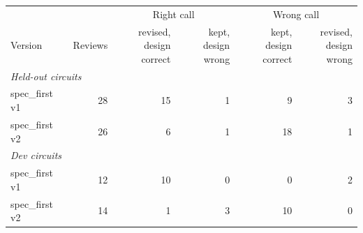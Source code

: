 \begin{tabular}{l r rr rr}
\toprule
& & \multicolumn{2}{c}{Right call} & \multicolumn{2}{c}{Wrong call} \\
\cmidrule(lr){3-4}\cmidrule(lr){5-6}
Version & Reviews & \makecell{revised,\\design correct} & \makecell{kept,\\design wrong} & \makecell{kept,\\design correct} & \makecell{revised,\\design wrong} \\
\midrule
\multicolumn{6}{l}{\textit{Held-out circuits}} \\
spec\_first v1 & 28 & 15 & 1 & 9 & 3 \\
spec\_first v2 & 26 & 6 & 1 & 18 & 1 \\
\midrule
\multicolumn{6}{l}{\textit{Dev circuits}} \\
spec\_first v1 & 12 & 10 & 0 & 0 & 2 \\
spec\_first v2 & 14 & 1 & 3 & 10 & 0 \\
\bottomrule
\end{tabular}
